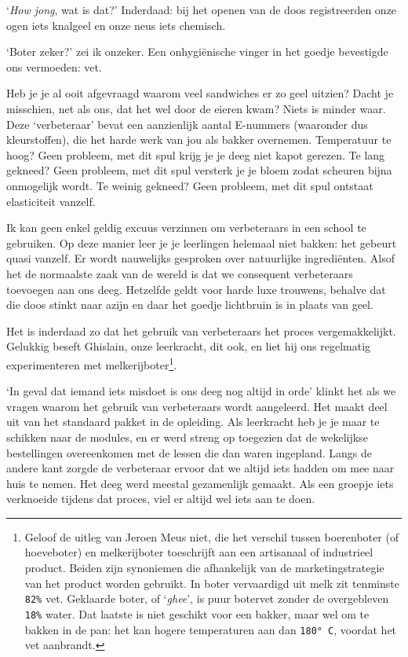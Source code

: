 \documentclass[
  11pt,
  dutch,
]{memoir}
\begin{document}
`\emph{How jong}, wat is dat?' Inderdaad: bij het openen van de doos
registreerden onze ogen iets knalgeel en onze neus iets chemisch.

`Boter zeker?' zei ik onzeker. Een onhygiënische vinger in het goedje
bevestigde ons vermoeden: vet.

Heb je je al ooit afgevraagd waarom veel sandwiches er zo geel uitzien?
Dacht je misschien, net als ons, dat het wel door de eieren kwam? Niets
is minder waar. Deze `verbeteraar' bevat een aanzienlijk aantal
E-nummers (waaronder dus kleurstoffen), die het harde werk van jou als
bakker overnemen. Temperatuur te hoog? Geen probleem, met dit spul krijg
je je deeg niet kapot gerezen. Te lang gekneed? Geen probleem, met dit
spul versterk je je bloem zodat scheuren bijna onmogelijk wordt. Te
weinig gekneed? Geen probleem, met dit spul ontstaat elasticiteit
vanzelf.

Ik kan geen enkel geldig excuus verzinnen om verbeteraars in een school
te gebruiken. Op deze manier leer je je leerlingen helemaal niet bakken:
het gebeurt quasi vanzelf. Er wordt nauwelijks gesproken over
natuurlijke ingrediënten. Alsof het de normaalste zaak van de wereld is
dat we consequent verbeteraars toevoegen aan ons deeg. Hetzelfde geldt
voor harde luxe trouwens, behalve dat die doos stinkt naar azijn en daar
het goedje lichtbruin is in plaats van geel.

Het is inderdaad zo dat het gebruik van verbeteraars het proces
vergemakkelijkt. Gelukkig beseft Ghislain, onze leerkracht, dit ook, en
liet hij ons regelmatig experimenteren met melkerijboter\footnote{Geloof
  de uitleg van Jeroen Meus niet, die het verschil tussen boerenboter
  (of hoeveboter) en melkerijboter toeschrijft aan een artisanaal of
  industrieel product. Beiden zijn synoniemen die afhankelijk van de
  marketingstrategie van het product worden gebruikt. In boter
  vervaardigd uit melk zit tenminste \texttt{82\%} vet. Geklaarde boter,
  of `\emph{ghee}', is puur botervet zonder de overgebleven
  \texttt{18\%} water. Dat laatste is niet geschikt voor een bakker,
  maar wel om te bakken in de pan: het kan hogere temperaturen aan dan
  \texttt{180°\ C}, voordat het vet aanbrandt.}.

`In geval dat iemand iets misdoet is ons deeg nog altijd in orde' klinkt
het als we vragen waarom het gebruik van verbeteraars wordt aangeleerd.
Het maakt deel uit van het standaard pakket in de opleiding. Als
leerkracht heb je je maar te schikken naar de modules, en er werd streng
op toegezien dat de wekelijkse bestellingen overeenkomen met de lessen
die dan waren ingepland. Langs de andere kant zorgde de verbeteraar
ervoor dat we altijd iets hadden om mee naar huis te nemen. Het deeg
werd meestal gezamenlijk gemaakt. Als een groepje iets verknoeide
tijdens dat proces, viel er altijd wel iets aan te doen.
\end{document}
